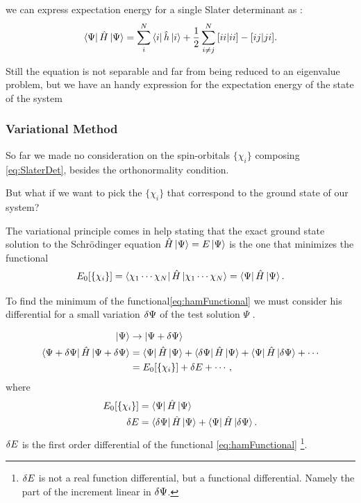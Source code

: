\documentclass[a4paper,12pt]{article}
\newcommand{\jsqrt}[2]{\bqty{ #1 #1 | #2 #2 }}
\newcommand{\ksqrt}[2]{\bqty{ #1 #2 | #2 #1 }}
\begin{document}
we can express expectation energy for a single Slater determinant as :
\begin{equation}
	\bra{\Psi} \hat{H} \ket{\Psi} = \sum_{i}^{N} \bra{i} \hat{h} \ket{i} + \frac{1}{2} \sum_{i \neq j}^{N} \jsqrt{i}{i} - \ksqrt{i}{j}.
\end{equation}

Still the equation is not separable and far from being reduced to an eigenvalue problem, but we have an handy expression for the expectation energy of the state of the system

\subsubsection{Variational Method}
So far we made no consideration on the spin-orbitals $\{ \chi_{i} \}$ composing \eqref{eq:SlaterDet}, besides the orthonormality condition.

But what if we want to pick the $\{ \chi_{i} \}$ that correspond to the ground state of our system?

The variational principle comes in help stating that the exact ground state solution to the Schr\"odinger equation $\hat{H} \ket{\Psi} = E \ket{\Psi}$ is the one that minimizes the functional 
\begin{equation} \label{eq:hamFunctional}
	E_{0}[\{\chi_{i}\}] = \bra{\chi_1 \cdots \chi_N} \hat{H} \ket{\chi_1 \cdots \chi_N} = \bra{\Psi} \hat{H} \ket{\Psi}.
\end{equation}

To find the minimum of the functional\eqref{eq:hamFunctional} we must consider his differential for a small variation $\var{\Psi}$ of the test solution $\Psi$  \cite[p.165]{Carati}.  

\begin{align}
	\ket{\Psi} & \rightarrow \ket{\Psi + \var{\Psi}} 
\\
	\bra{\Psi + \var{\Psi}} \hat{H} \ket{\Psi + \var{\Psi}} & = 
		\bra{\Psi} \hat{H} \ket{\Psi} 
		+ \bra{\var{\Psi}} \hat{H} \ket{\Psi} 
		+ \bra{\Psi} \hat{H} \ket{\var{\Psi}} 
		+ \cdots
\\
		 & = E_{0}[\{\chi_{i}\}] + \var{E} + \cdots,
\end{align}
where
\begin{align}
	E_{0}[\{\chi_{i}\}] & = 	\bra{\Psi} \hat{H} \ket{\Psi}  \\
	\var{E} & = \bra{\var{\Psi}} \hat{H} \ket{\Psi} 	+ \bra{\Psi} \hat{H} \ket{\var{\Psi}} .
\end{align}
$\var{E}$ is the first order differential of the functional \eqref{eq:hamFunctional} \footnote{$\var{E}$ is not a real function differential, but a functional differential. Namely the part of the increment linear in $\var{\Psi}$.}.
\end{document}
